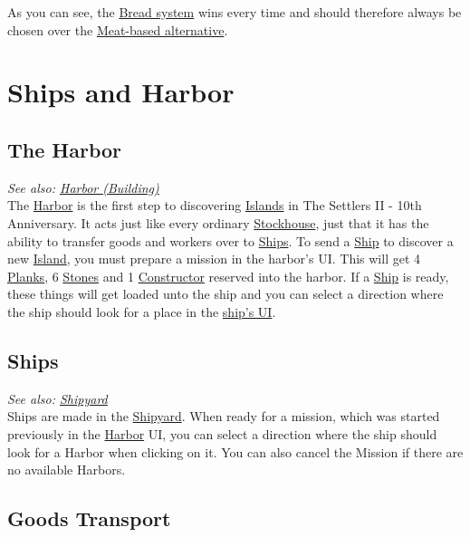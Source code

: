 \documentclass[12pt]{article}
\begin{document}
As you can see, the \hyperref[sec:bread]{Bread system} wins every time and should therefore always be chosen over the \hyperref[sec:hamslaughter]{Meat-based alternative}.

\section{Ships and Harbor}
\label{sec:shipsandharbor}

\subsection{The Harbor}
\label{sec:harbor}

\textit{See also: \hyperref[sec:harbor_building]{Harbor (Building)}}\\

The \hyperref[sec:building_harbor]{Harbor} is the first step to discovering \hyperref[sec:islands]{Islands} in The Settlers II - 10th Anniversary. It acts just like every ordinary \hyperref[sec:stockhouse]{Stockhouse}, just that it has the ability to transfer goods and workers over to \hyperref[sec:ships]{Ships}. To send a \hyperref[sec:ships]{Ship} to discover a new \hyperref[sec:islands]{Island}, you must prepare a mission in the harbor's UI. This will get 4 \hyperref[sec:plank]{Planks}, 6 \hyperref[sec:stone]{Stones} and 1 \hyperref[sec:constructor]{Constructor} reserved into the harbor. If a \hyperref[sec:ships]{Ship} is ready, these things will get loaded unto the ship and you can select a direction where the ship should look for a place in the \hyperref[sec:ships]{ship's UI}.

\subsection{Ships}
\label{sec:ships}

\textit{See also: \hyperref[sec:shipyard]{Shipyard}}\\

Ships are made in the \hyperref[sec:shipyard]{Shipyard}. When ready for a mission, which was started previously in the \hyperref[sec:harbor]{Harbor} UI, you can select a direction where the ship should look for a Harbor when clicking on it. You can also cancel the Mission if there are no available Harbors.

\subsection{Goods Transport}
\label{sec:goodstransport}
\end{document}
